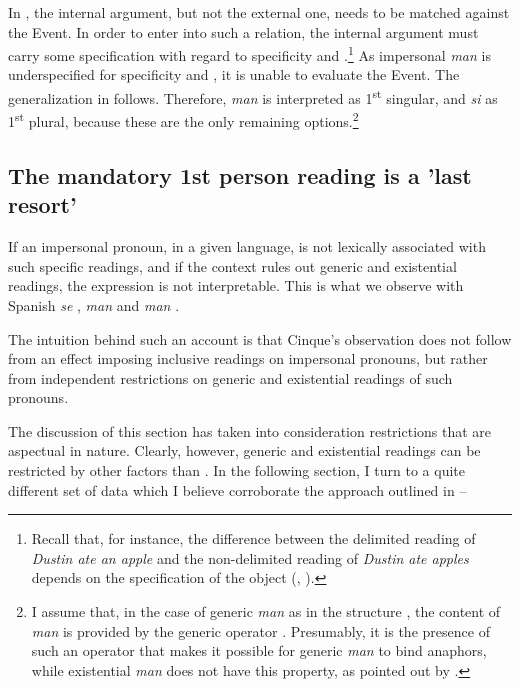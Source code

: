 \documentclass[output=paper]{LSP/langsci}
\begin{document}
In , the internal argument, but not the external one, needs to be matched against the Event. In order to enter into such a relation, the internal argument must carry some specification with regard to specificity and .\footnote{Recall that, for instance, the difference between the delimited reading of \textit{Dustin ate an apple} and the non-delimited reading of \textit{Dustin ate apples} depends on the  specification of the object (\citealt{Carlson1977}, \citealt[113]{Tenny1987}).} As impersonal \textit{man} is underspecified for specificity and , it is unable to evaluate the Event. The generalization in  follows. Therefore,  \textit{man} is interpreted as 1\textsuperscript{st} singular, and  \textit{si} as 1\textsuperscript{st} plural, because these are the only remaining options.\footnote{I assume that, in the case of generic \textit{man} as in the structure , the  content of \textit{man} is provided by the generic operator \citep{Chierchia1995}. Presumably, it is the presence of such an operator that makes it possible for generic \textit{man} to bind anaphors, while existential \textit{man} does not have this property, as pointed out by \citet{CabredoHofherr2010}.}

\subsection{The mandatory 1st person reading is a 'last resort'}\label{sec:egerland:3.3}

If an impersonal pronoun, in a given language, is not lexically associated with such specific readings, and if the context rules out generic and existential readings, the expression is not interpretable. This is what we observe with Spanish \textit{se} ,  \textit{man}  and  \textit{man} .

The intuition behind such an account is that Cinque’s observation does not follow from an effect imposing inclusive readings on impersonal pronouns, but rather from independent restrictions on generic and existential readings of such pronouns.

The discussion of this section has taken into consideration restrictions that are aspectual in nature. Clearly, however, generic and existential readings can be restricted by other factors than . In the following section, I turn to a quite different set of data which I believe corroborate the approach outlined in --
\end{document}
